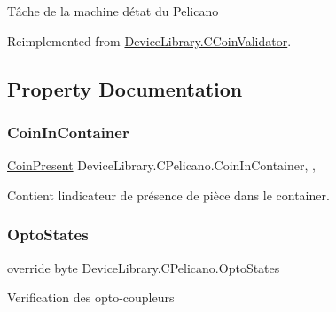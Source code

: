 Tâche de la machine d\textquotesingle{}état du Pelicano 



Reimplemented from \mbox{\hyperlink{class_device_library_1_1_c_coin_validator_a0e406f9e175eb8d295fe7406e6a948af}{Device\+Library.\+C\+Coin\+Validator}}.



\subsection{Property Documentation}
\mbox{\label{class_device_library_1_1_c_pelicano_ab713ffb697fd137013a1e2ade48406e2}} 
\subsubsection{\texorpdfstring{Coin\+In\+Container}{CoinInContainer}}
{\footnotesize\ttfamily \mbox{\hyperlink{class_device_library_1_1_c_pelicano_a87743bbef8551b7349239f48892309c5}{Coin\+Present}} Device\+Library.\+C\+Pelicano.\+Coin\+In\+Container\hspace{0.3cm}{\ttfamily [get]}, {\ttfamily [set]}, {\ttfamily [protected]}}



Contient l\textquotesingle{}indicateur de présence de pièce dans le container. 

\mbox{\label{class_device_library_1_1_c_pelicano_a4c21a4fe99ac28fed816dc5cb07fc794}} 
\subsubsection{\texorpdfstring{Opto\+States}{OptoStates}}
{\footnotesize\ttfamily override byte Device\+Library.\+C\+Pelicano.\+Opto\+States\hspace{0.3cm}{\ttfamily [get]}}



Verification des opto-\/coupleurs 

